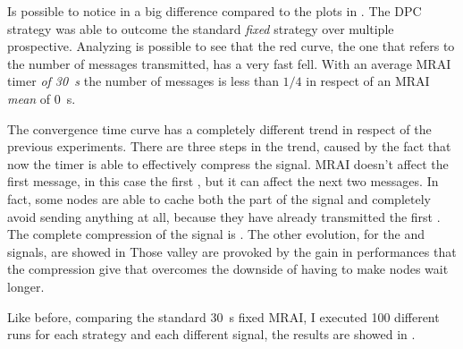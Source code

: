 Is possible to notice in  a big difference
compared to the plots in .
The \ac{DPC} strategy was able to outcome the standard \textit{fixed} strategy
over multiple prospective.
Analyzing  is possible to see that
the red curve, the one that refers to the number of messages transmitted, has
a very fast fell.
With an average \ac{MRAI} timer \textit{of \SI{30}{\second}}
the number of messages is less than $1/4$ in respect of an \ac{MRAI} \textit{mean}
of \SI{0}{\second}.

The convergence time curve has a completely different trend in respect of the
previous experiments.
There are three steps in the trend, caused by the fact that
now the timer is able to effectively compress the signal.
\ac{MRAI} doesn't affect the first message, in this case the first  , but
it can affect the next two messages.
In fact, some nodes are able to cache both the  part of the signal and
completely avoid sending anything at all, because they have already transmitted
the first .
The complete compression of the signal  is .
The other evolution, for the  and  signals, are showed in
Those valley are provoked by the gain in performances that the compression give
that overcomes the downside of having to make nodes wait longer.

Like before, comparing the standard \SI{30}{\second} fixed \ac{MRAI}, I executed
\num{100} different runs for each strategy and each different signal, the results
are showed in .

